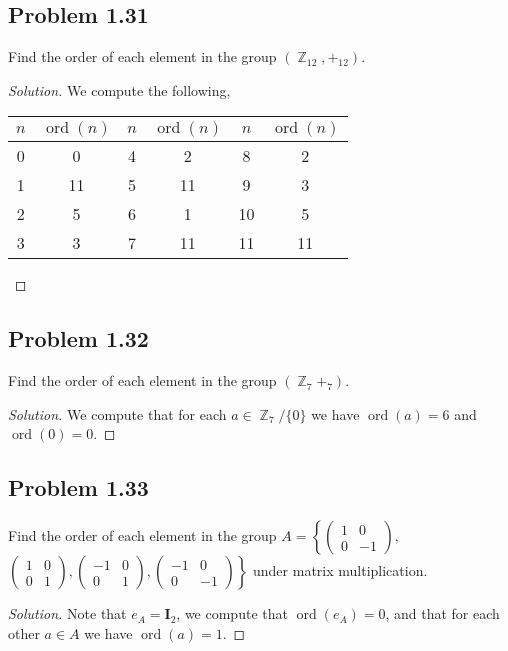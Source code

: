\documentclass{amsbook}
\DeclareMathOperator{\ord}{\text{ord}}
\DeclareMathOperator{\Z}{\mathbb{Z}}
\begin{document}
			\subsection*{Problem 1.31}
			\label{sub:problem_1_31}
			Find the order of each element in the group $(\Z_{12}, +_{12})$.
			\begin{proof}[Solution] We compute the following,\\

				\begin{tabular}{cc|cc|cc}
				$n$ & $\ord(n)$ & $n$ & $\ord(n)$ & $n$ & $\ord(n)$ \\
				\hline
				\hline
				0 & 0  & 4 & 2  & 8  & 2 \\
				1 & 11 & 5 & 11 & 9  & 3 \\
				2 & 5  & 6 & 1  & 10 & 5 \\
				3 & 3  & 7 & 11 & 11 & 11
				\end{tabular}
			\end{proof}

			\subsection*{Problem 1.32}
			\label{sub:problem_1_32}
			Find the order of each element in the group $(\Z_{7} +_{7})$.
			\begin{proof}[Solution] We compute that for each $a \in \Z_{7}/\{0\}$ we have $\ord(a) = 6$ and $\ord(0)=0$.
			\end{proof}

			\subsection*{Problem 1.33}
			\label{sub:problem_1_4_33}
			Find the order of each element in the group $A = \left\{ \begin{pmatrix} 1 & 0 \\ 0 & -1 \end{pmatrix}, \right.$ \\
			$\left. \begin{pmatrix} 1 & 0 \\ 0 & 1 \end{pmatrix}, \begin{pmatrix} -1 & 0 \\ 0 & 1 \end{pmatrix}, \begin{pmatrix} -1 & 0 \\ 0 & -1 \end{pmatrix} \right\}$ under matrix multiplication.
			\begin{proof}[Solution] Note that $e_{A} = \mathbf{I}_{2}$, we compute that $\ord(e_{A}) = 0$, and that for each other $a \in A$ we have $\ord(a) = 1$.
			\end{proof}
\end{document}
